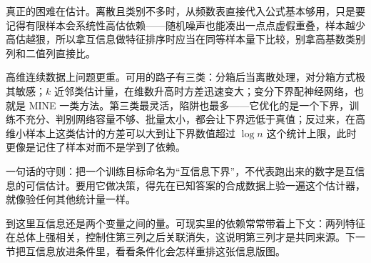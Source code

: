 真正的困难在估计。离散且类别不多时，从频数表直接代入公式基本够用，只是要记得有限样本会系统性高估依赖——随机噪声也能凑出一点点虚假重叠，样本越少高估越狠，所以拿互信息做特征排序时应当在同等样本量下比较，别拿高基数类别列和二值列直接比。

高维连续数据上问题更重。可用的路子有三类：分箱后当离散处理，对分箱方式极其敏感；\(k\) 近邻类估计量，在维数升高时方差迅速变大；变分下界配神经网络，也就是 MINE 一类方法。第三类最灵活，陷阱也最多——它优化的是一个下界，训练不充分、判别网络容量不够、批量太小，都会让下界远低于真值；反过来，在高维小样本上这类估计的方差可以大到让下界数值超过 \(\log n\) 这个统计上限，此时更像是记住了样本对而不是学到了依赖。

一句话的守则：把一个训练目标命名为``互信息下界''，不代表跑出来的数字是互信息的可信估计。要用它做决策，得先在已知答案的合成数据上验一遍这个估计器，就像验任何其他统计量一样。

到这里互信息还是两个变量之间的量。可现实里的依赖常常带着上下文：两列特征在总体上强相关，控制住第三列之后关联消失，这说明第三列才是共同来源。下一节把互信息放进条件里，看看条件化会怎样重排这张信息版图。

